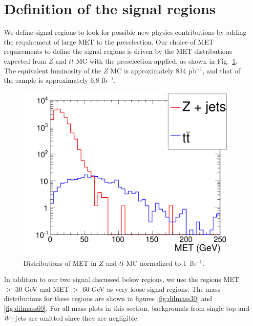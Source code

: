 \section{Definition of the signal regions}
\label{sec:sigregion}

We define signal regions to look for possible
new physics contributions by adding the requirement of large MET to the preselection. 
Our choice of MET requirements to define the signal regions is driven by the 
MET distributions expected from $Z$ and $t\bar{t}$ MC with the preselection applied, 
as shown in Fig.~\ref{fig:metdist}. The equivalent luminosity of the $Z$ MC is 
approximately 834 pb$^{-1}$, and that of the \ttbar sample is approximately 6.8 fb$^{-1}$.

\begin{figure}[tbh]
  \begin{center}
	\includegraphics[width=0.75\linewidth]{plots/met_ttbar_Z.pdf}
	\caption{
	  \label{fig:metdist}\protect 
	  Distributions of MET in $Z$ and $t\bar{t}$ MC normalized to 1~fb$^{-1}$.}
  \end{center}
\end{figure}


In addition to our two signal discussed below regions, 
we use the regions MET $>$ 30 GeV and MET $>$ 60 GeV
as very loose signal regions. The mass distributions for these regions are shown in
figures \ref{fig:dilmass30} and \ref{fig:dilmass60}.
For all mass plots in this section, backgrounds from single top 
and $W$+jets are omitted since they are negligible.

